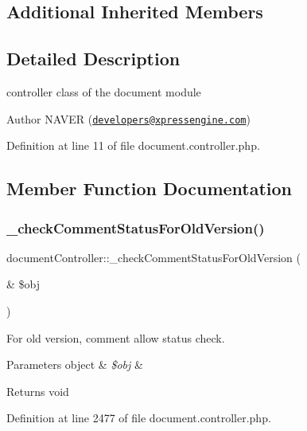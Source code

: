 \subsection*{Additional Inherited Members}


\subsection{Detailed Description}
controller class of the document module 

\begin{DoxyAuthor}{Author}
N\+A\+V\+ER (\href{mailto:developers@xpressengine.com}{\tt developers@xpressengine.\+com}) 
\end{DoxyAuthor}


Definition at line 11 of file document.\+controller.\+php.



\subsection{Member Function Documentation}
\hypertarget{classdocumentController_a3fad5f9653c0ca05bcb1a63a24c318cf}{}\label{classdocumentController_a3fad5f9653c0ca05bcb1a63a24c318cf} 
\subsubsection{\texorpdfstring{\+\_\+check\+Comment\+Status\+For\+Old\+Version()}{\_checkCommentStatusForOldVersion()}}
{\footnotesize\ttfamily document\+Controller\+::\+\_\+check\+Comment\+Status\+For\+Old\+Version (\begin{DoxyParamCaption}\item[{\&}]{\$obj }\end{DoxyParamCaption})}

For old version, comment allow status check. 
\begin{DoxyParams}[1]{Parameters}
object & {\em \$obj} & \\
\hline
\end{DoxyParams}
\begin{DoxyReturn}{Returns}
void 
\end{DoxyReturn}


Definition at line 2477 of file document.\+controller.\+php.

